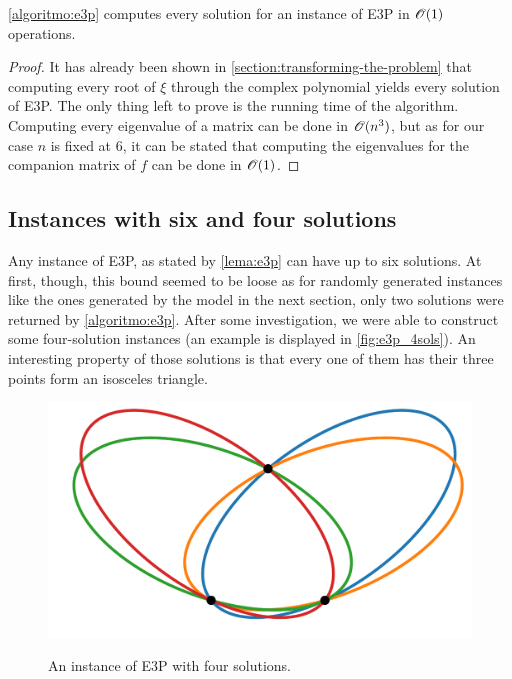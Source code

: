 \begin{teorema}\label{th:e3p}
	\autoref{algoritmo:e3p} computes every solution for an instance of E3P in $\mathscr{O}(1)$ operations.
\end{teorema}

\begin{proof}
	It has already been shown in \autoref{section:transforming-the-problem} that computing every root of $\xi$ through the complex polynomial yields every solution of E3P. The only thing left to prove is the running time of the algorithm.
	Computing every eigenvalue of a matrix can be done in $\mathscr{O}(n^3)$, but as for our case $n$ is fixed at $6$, it can be stated that computing the eigenvalues for the companion matrix of $f$ can be done in $\mathscr{O}(1)$.
\end{proof}

\subsection{Instances with six and four solutions}

Any instance of E3P, as stated by \autoref{lema:e3p} can have up to six solutions. At first, though, this bound seemed to be loose as for randomly generated instances like the ones generated by the model in the next section, only two solutions were returned by \autoref{algoritmo:e3p}.
After some investigation, we were able to construct some four-solution instances (an example is displayed in \autoref{fig:e3p_4sols}). An interesting property of those solutions is that every one of them has their three points form an isosceles triangle.

\begin{figure}[H]
	\centering
	\caption{An instance of E3P with four solutions.}
	\includegraphics[scale=.33]{tex/figures/e3p_4sols}
	\fautor
	\label{fig:e3p_4sols}
\end{figure}

